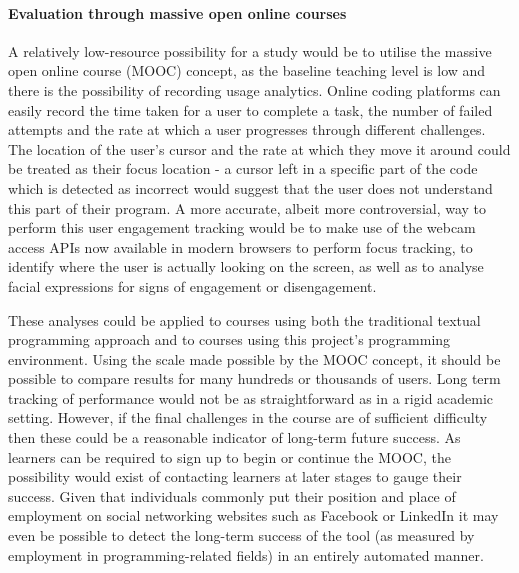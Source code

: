 \paragraph{Evaluation through massive open online courses}
A relatively low-resource possibility for a study would be to utilise the massive open online course (MOOC) concept, as the baseline teaching level is low and there is the possibility of recording usage analytics. Online coding platforms can easily record the time taken for a user to complete a task, the number of failed attempts and the rate at which a user progresses through different challenges. The location of the user's cursor and the rate at which they move it around could be treated as their focus location - a cursor left in a specific part of the code which is detected as incorrect would suggest that the user does not understand this part of their program. A more accurate, albeit more controversial, way to perform this user engagement tracking would be to make use of the webcam access APIs now available in modern browsers to perform focus tracking, to identify where the user is actually looking on the screen, as well as to analyse facial expressions for signs of engagement or disengagement.

These analyses could be applied to courses using both the traditional textual programming approach and to courses using this project's programming environment. Using the scale made possible by the MOOC concept, it should be possible to compare results for many hundreds or thousands of users. Long term tracking of performance would not be as straightforward as in a rigid academic setting. However, if the final challenges in the course are of sufficient difficulty then these could be a reasonable indicator of long-term future success. As learners can be required to sign up to begin or continue the MOOC, the possibility would exist of contacting learners at later stages to gauge their success. Given that individuals commonly put their position and place of employment on social networking websites such as Facebook or LinkedIn it may even be possible to detect the long-term success of the tool (as measured by employment in programming-related fields) in an entirely automated manner.

